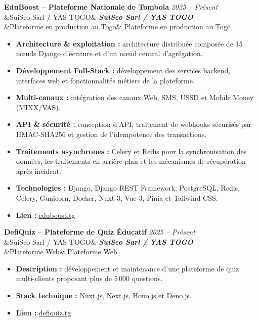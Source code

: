 \documentclass[11pt,a4paper]{article}
\newcommand{\cventry}[4]{%
    \needspace{3\baselineskip}%
    \noindent\textbf{\large #1}
    \hfill
    {\small\color{secondary}\textit{#2}}\\[2pt]%
    \ifx&#3&\else
        \noindent\textbf{\textit{#3}}\\[3pt]%
    \fi
    \ifx&#4&\else
        \noindent #4%
    \fi
    \vspace{6pt}\par
}
\begin{document}
\cventry
{EduBoost -- Plateforme Nationale de Tombola}
{2025 -- Présent}
{SuiSco Sarl / YAS TOGO}
{Plateforme en production au Togo}

\begin{itemize}

    \item \textbf{Architecture \& exploitation :}
    architecture distribuée composée de 15 nœuds Django d'écriture
    et d'un nœud central d'agrégation.

    \item \textbf{Développement Full-Stack :}
    développement des services backend, interfaces web et
    fonctionnalités métiers de la plateforme.

    \item \textbf{Multi-canaux :}
    intégration des canaux Web, SMS, USSD et Mobile Money
    (MIXX/VAS).

    \item \textbf{API \& sécurité :}
    conception d'API, traitement de webhooks sécurisés par
    HMAC-SHA256 et gestion de l'idempotence des transactions.

    \item \textbf{Traitements asynchrones :}
    Celery et Redis pour la synchronisation des données,
    les traitements en arrière-plan et les mécanismes
    de récupération après incident.

    \item \textbf{Technologies :}
    Django, Django REST Framework, PostgreSQL, Redis, Celery,
    Gunicorn, Docker, Nuxt 3, Vue 3, Pinia et Tailwind CSS.

    \item \textbf{Lien :}
    \href{https://www.eduboost.tg}{eduboost.tg}

\end{itemize}

\vspace{4pt}

\cventry
{DefiQuiz -- Plateforme de Quiz Éducatif}
{2025 -- Présent}
{SuiSco Sarl / YAS TOGO}
{Plateforme Web}

\begin{itemize}

    \item \textbf{Description :}
    développement et maintenance d'une plateforme de quiz
    multi-clients proposant plus de 5\,000 questions.

    \item \textbf{Stack technique :}
    Nuxt.js, Next.js, Hono.js et Deno.js.

    \item \textbf{Lien :}
    \href{https://defiquiz.tg/}{defiquiz.tg}

\end{itemize}
\end{document}
